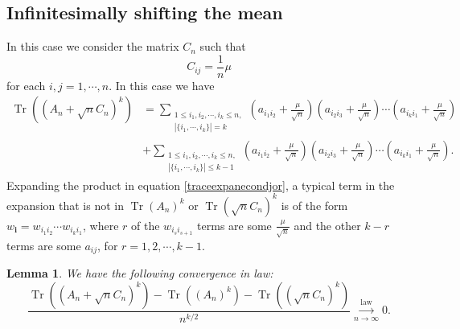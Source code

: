 \documentclass[12pt, reqno]{amsart}
\newtheorem{lemma}[theorem]{Lemma}
\theoremstyle{definition}
\theoremstyle{remark}
\numberwithin{equation}{section}
\begin{document}
\subsection{Infinitesimally shifting the mean} In this case we consider the matrix $C_n$ such that 
$$
C_{ij}=\frac{1}{n}\mu
$$ for each $i,j=1,\cdots,n$.
In this case we have
\begin{equation}\label{traceexpanecondjor}\begin{aligned}
\operatorname{Tr}((A_n+\sqrt{n}C_n)^k)&=\sum_{\substack{1\leq i_1,i_2,\cdots, i_k\leq n,\\|\{i_1,\cdots,i_k\}|=k}}(a_{i_1i_2}+\frac{\mu}{\sqrt{n}})(a_{i_2i_3}+\frac{\mu}{\sqrt{n}})\cdots (a_{i_ki_1}+\frac{\mu}{\sqrt{n}})\\&+\sum_{\substack{1\leq i_1,i_2,\cdots, i_k\leq n,\\ |\{i_1,\cdots,i_k\}|\leq k-1}} (a_{i_1i_2}+\frac{\mu}{\sqrt{n}})(a_{i_2i_3}+\frac{\mu}{\sqrt{n}})\cdots (a_{i_ki_1}+\frac{\mu}{\sqrt{n}})
.
\end{aligned}
\end{equation}
Expanding the product in equation \eqref{traceexpanecondjor}, a typical term in the expansion that is not in $\operatorname{Tr}(A_n)^k$ or $\operatorname{Tr}(\sqrt{n}C_n)^k$ is of the form $w_{\mathbf{i}}=w_{i_1i_2}\cdots w_{i_ki_1}$, where $r$ of the $w_{i_si_{s+1}}$ terms are some $\frac{\mu}{\sqrt{n}}$ and the other $k-r$ terms are some $a_{ij}$, for $r=1,2,\cdots,k-1$.

\begin{lemma}\label{fuckgreat}
    We have the following convergence in law:
\begin{equation}\label{eq2.14}
   \frac{\operatorname{Tr}((A_n+\sqrt{n}C_n)^k)-\operatorname{Tr}((A_n)^k)-\operatorname{Tr}((\sqrt{n}C_n)^k)}{n^{k/2}}\overset{\text{law}}{\underset{n\to\infty}\longrightarrow}0.
\end{equation}
\end{lemma}
\end{document}
